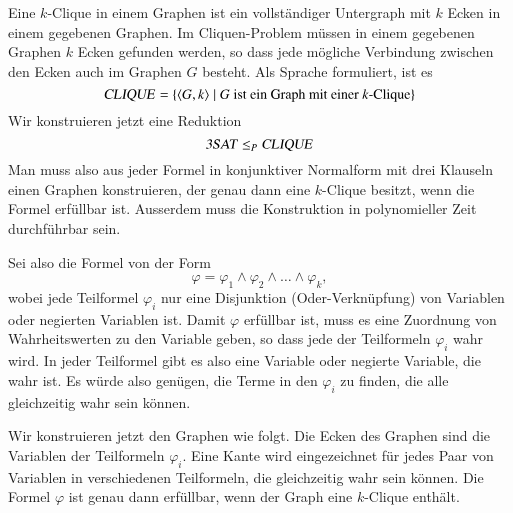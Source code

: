 \begin{beispiel}
Eine $k$-Clique in einem Graphen ist ein vollständiger
Untergraph mit $k$ Ecken in einem gegebenen Graphen. Im Cliquen-Problem müssen
in einem gegebenen Graphen $k$ Ecken gefunden werden, so dass
jede mögliche Verbindung zwischen den Ecken auch im Graphen $G$ 
besteht. Als Sprache formuliert, ist es
\[
\text{\textsl{CLIQUE}}
=\{
\langle G,k\rangle\;|\;\text{$G$ ist ein Graph mit einer $k$-Clique}
\}
\]
Wir konstruieren jetzt eine Reduktion 
\[
\text{\textsl{3SAT}}\le_P
\text{\textsl{CLIQUE}}
\]
Man muss also aus jeder Formel in konjunktiver Normalform mit
drei Klauseln einen Graphen konstruieren, der genau dann eine
$k$-Clique besitzt, wenn die Formel erfüllbar ist. Ausserdem
muss die Konstruktion in polynomieller Zeit durchführbar sein.

Sei also die Formel von der Form
\[
\varphi
=
\varphi_1\wedge\varphi_2\wedge\dots\wedge\varphi_k,
\]
wobei jede Teilformel $\varphi_i$ nur eine Disjunktion (Oder-Verknüpfung)
von Variablen oder negierten Variablen ist. Damit $\varphi$
erfüllbar ist, muss es eine Zuordnung von Wahrheitswerten zu
den Variable geben, so dass jede der Teilformeln $\varphi_i$ wahr
wird. In jeder Teilformel gibt es also eine Variable oder 
negierte Variable, die wahr ist. Es würde also genügen,
die Terme in den $\varphi_i$ zu finden, die alle gleichzeitig
wahr sein können.

Wir konstruieren jetzt den Graphen wie folgt. Die Ecken des Graphen
sind die Variablen der Teilformeln $\varphi_i$. Eine Kante wird
eingezeichnet für jedes Paar von Variablen in verschiedenen
Teilformeln, die gleichzeitig wahr sein können. Die Formel $\varphi$
ist genau dann erfüllbar, wenn der Graph eine $k$-Clique enthält.


\end{beispiel}
